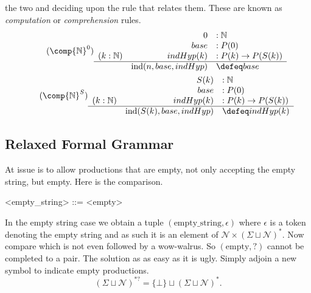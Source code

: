 the two and deciding upon the rule that relates them.
These are known as \emph{computation} or \emph{comprehension}
rules.
\begin{gather}
\tag{$\comp{\mathbb{N}}^0$}
    \begin{array}{crl}
        & 0 & :\mathbb{N}\\
        & base & : P(0)\\
    (k:\mathbb{N})    & indHyp(k) &: P(k)\to P(S(k))\\
    \hline 
        & \text{ind}(n,base,indHyp) & \defeq base
    \end{array}\\
\tag{$\comp{\mathbb{N}}^{S}$}
    \begin{array}{crl}
        & S(k) & :\mathbb{N}\\        
        & base & : P(0)\\
    (k:\mathbb{N})    & indHyp(k) &: P(k)\to P(S(k))\\
    \hline 
        & \text{ind}(S(k),base,indHyp) & \defeq  indHyp(k)
    \end{array}
\end{gather}

\subsection{Relaxed Formal Grammar}
At issue is to allow productions that are empty, not only accepting the 
empty string, but empty.  Here is the comparison.
\begin{center}
\begin{Gcode}[]
<empty_string> ::=
<empty>
\end{Gcode}
\end{center}
In the empty string case we obtain a tuple 
$(\text{empty\_ string},\epsilon)$ where $\epsilon$ is a token 
denoting the empty string and as such it is an element of 
$\mathcal{N}\times (\Sigma\sqcup \mathcal{N})^*$.
Now compare  which is not even followed by a 
wow-walrus.  So $(\text{empty},?)$ cannot be completed to a pair.
The solution as as easy as it is ugly.  Simply adjoin a new symbol 
to indicate empty productions.  
\[
    (\Sigma\sqcup \mathcal{N})^{*?}
    =\{\bot\}\sqcup (\Sigma\sqcup \mathcal{N})^*.
\]